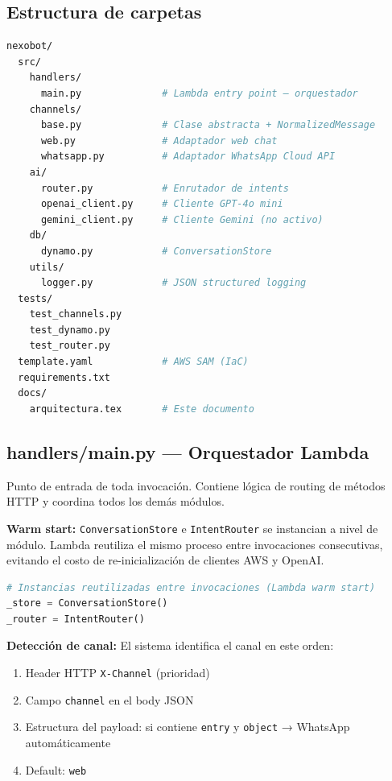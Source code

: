\documentclass[12pt,a4paper]{article}
\begin{document}
\subsection{Estructura de carpetas}

\begin{lstlisting}[language=bash, caption={Estructura del proyecto}]
nexobot/
  src/
    handlers/
      main.py              # Lambda entry point — orquestador
    channels/
      base.py              # Clase abstracta + NormalizedMessage
      web.py               # Adaptador web chat
      whatsapp.py          # Adaptador WhatsApp Cloud API
    ai/
      router.py            # Enrutador de intents
      openai_client.py     # Cliente GPT-4o mini
      gemini_client.py     # Cliente Gemini (no activo)
    db/
      dynamo.py            # ConversationStore
    utils/
      logger.py            # JSON structured logging
  tests/
    test_channels.py
    test_dynamo.py
    test_router.py
  template.yaml            # AWS SAM (IaC)
  requirements.txt
  docs/
    arquitectura.tex       # Este documento
\end{lstlisting}

\subsection{handlers/main.py — Orquestador Lambda}

Punto de entrada de toda invocación. Contiene lógica de routing de métodos HTTP
y coordina todos los demás módulos.

\begin{nexobox}
\textbf{Warm start:} \texttt{ConversationStore} e \texttt{IntentRouter} se instancian a nivel de módulo.
Lambda reutiliza el mismo proceso entre invocaciones consecutivas, evitando el costo de
re-inicialización de clientes AWS y OpenAI.
\end{nexobox}

\begin{lstlisting}[language=Python, caption={Singletons de módulo en main.py}]
# Instancias reutilizadas entre invocaciones (Lambda warm start)
_store = ConversationStore()
_router = IntentRouter()
\end{lstlisting}

\textbf{Detección de canal:} El sistema identifica el canal en este orden:
\begin{enumerate}
  \item Header HTTP \texttt{X-Channel} (prioridad)
  \item Campo \texttt{channel} en el body JSON
  \item Estructura del payload: si contiene \texttt{entry} y \texttt{object} → WhatsApp automáticamente
  \item Default: \texttt{web}
\end{enumerate}
\end{document}
